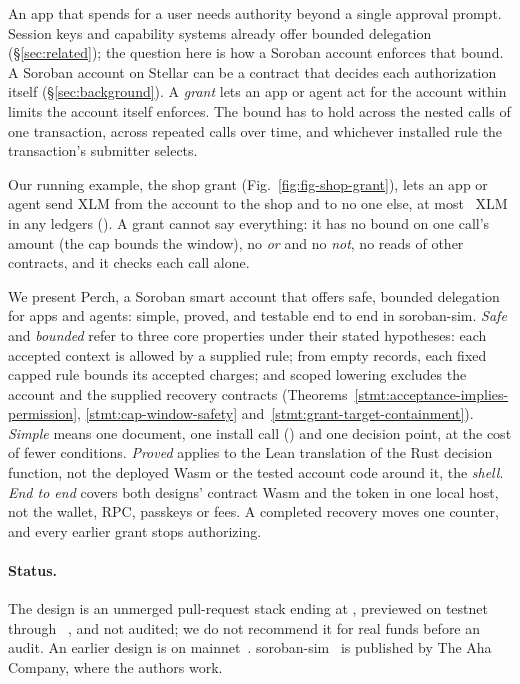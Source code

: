 An app that spends for a user needs authority beyond a single approval prompt.
Session keys and capability systems already offer bounded delegation
(\S\ref{sec:related}); the question here is how a Soroban account enforces that
bound. A Soroban account on Stellar can be a contract that decides each
authorization itself (\S\ref{sec:background}). A \emph{grant} lets an app or
agent act for the account within limits the account itself enforces.
The bound has to hold across the
nested calls of one transaction, across repeated calls over time, and whichever
installed rule the transaction's submitter selects.

Our running example, the shop grant (Fig.~\ref{fig:fig-shop-grant}), lets an
app or agent send XLM from the account to the shop and to no one else, at most
~XLM in any  ledgers
(). A grant cannot say everything: it has no bound on
one call's amount (the cap bounds the window), no \emph{or} and no \emph{not},
no reads of other contracts, and it checks each call alone.


We present Perch, a Soroban smart account that offers safe, bounded delegation
for apps and agents: simple, proved, and testable end to end in soroban-sim.
\emph{Safe} and \emph{bounded} refer to three core properties under their stated
hypotheses: each accepted context is allowed by a supplied rule; from empty
records, each fixed capped rule bounds its accepted charges; and scoped
lowering excludes the account and the supplied recovery contracts
(Theorems~\ref{stmt:acceptance-implies-permission},
\ref{stmt:cap-window-safety} and~\ref{stmt:grant-target-containment}).
\emph{Simple} means one document, one install call
() and one decision point, at the cost of fewer conditions.
\emph{Proved} applies to the Lean translation of the Rust decision function,
not the deployed Wasm or the tested account code around it, the \emph{shell}. \emph{End to end} covers both designs' contract Wasm and
the token in one local host, not the wallet, RPC, passkeys or fees. A completed
recovery moves one counter, and every earlier grant stops authorizing.

\paragraph{Status.} The design is an unmerged pull-request stack ending at
, previewed on testnet through
~, and not audited; we do not recommend it for real
funds before an audit. An earlier design is on mainnet~. \ifdefined\anonymous\else
soroban-sim~\cite{soroban-sim} is published by The Aha Company, where the
authors work.\fi

